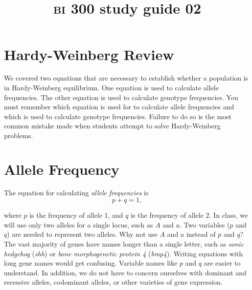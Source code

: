 \documentclass[letterpaper]{tufte-handout}
\title{{\scshape bi} 300 study guide 02\hfill}
\date{} %
\begin{document}
\maketitle	%

\section{Hardy-Weinberg Review}
We covered two equations that are necessary to establish whether a population is in Hardy-Weinberg equilibrium. One equation is used to calculate allele frequencies. The other equation is used to calculate genotype frequencies. You must remember which equation is used for to calculate allele frequencies and which is used to calculate genotype frequencies. Failure to do so is the most common mistake made when students attempt to solve Hardy-Weinberg problems.

\section{Allele Frequency}

The equation for calculating \emph{allele frequencies} is 
\begin{equation*}
	p+q = 1,
\end{equation*}
	
where $p$ is the frequency of allele 1, and $q$ is the frequency of allele 2. In class, we will use only two alleles for a single locus, such as $A$ and $a$.  Two variables ($p$ and $q$) are needed to represent two alleles.  Why not use $A$ and $a$ instead of $p$ and $q$?  The vast majority of genes have names longer than a single letter, such as \emph{sonic hedgehog} (\emph{shh}) or \emph{bone morphogenetic protein 4} (\emph{bmp4}). Writing equations with long gene names would get confusing. Variable names like $p$ and $q$ are easier to understand.  In addition, we do not have to concern ourselves with dominant and recessive alleles, codominant alleles, or other varieties of gene expression. 
\end{document}
